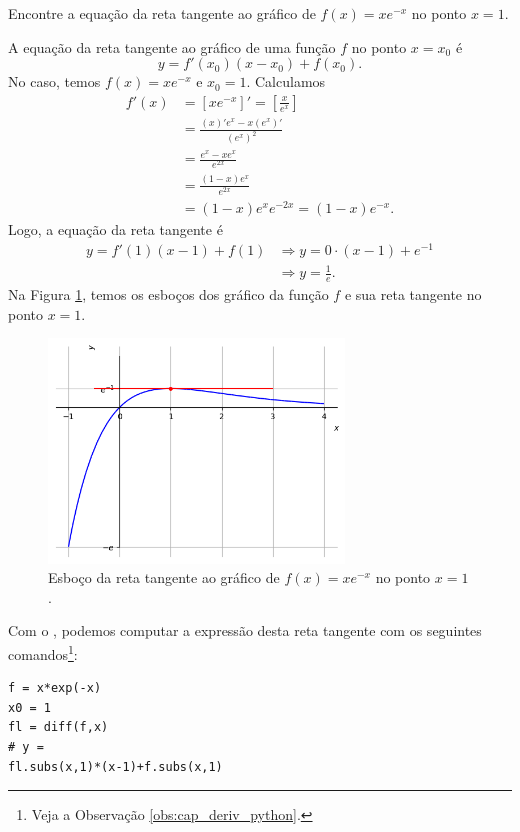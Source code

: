 \begin{exeresol}
  Encontre a equação da reta tangente ao gráfico de $f(x) = xe^{-x}$ no ponto $x=1$.
\end{exeresol}
\begin{resol}
  A equação da reta tangente ao gráfico de uma função $f$ no ponto $x=x_0$ é
  \begin{equation}
    y = f'(x_0)(x-x_0)+f(x_0).
  \end{equation}
  No caso, temos $f(x)=xe^{-x}$ e $x_0=1$. Calculamos
  \begin{align}
    f'(x) &= [xe^{-x}]' = \left[\frac{x}{e^x}\right] \\
          &= \frac{(x)'e^x-x(e^x)'}{(e^x)^2} \\
          &= \frac{e^x-xe^x}{e^{2x}} \\
          &= \frac{(1-x)e^x}{e^{2x}} \\
          &= (1-x)e^xe^{-2x} = (1-x)e^{-x}.
  \end{align}
  Logo, a equação da reta tangente é
  \begin{align}
    y = f'(1)(x-1)+f(1) &\Rightarrow y = 0\cdot (x-1) + e^{-1}\\
                        &\Rightarrow y = \frac{1}{e}.
  \end{align}
  Na Figura \ref{fig:deriv_exeresol_rt_xe-x}, temos os esboços dos gráfico da função $f$ e sua reta tangente no ponto $x=1$.

  \begin{figure}[H]
    \centering
    \includegraphics[width=0.7\textwidth]{./cap_deriv/dados/fig_deriv_exeresol_rt_xe-x/fig_deriv_exeresol_rt_xe-x}
    \caption{Esboço da reta tangente ao gráfico de $f(x)=xe^{-x}$ no ponto $x=1$.}
    \label{fig:deriv_exeresol_rt_xe-x}
  \end{figure}

  \ifispython
  Com o \sympy, podemos computar a expressão desta reta tangente com os seguintes comandos\footnote{Veja a Observação \ref{obs:cap_deriv_python}.}:
\begin{verbatim}
f = x*exp(-x)
x0 = 1
fl = diff(f,x)
# y = 
fl.subs(x,1)*(x-1)+f.subs(x,1)
\end{verbatim}
  \fi
\end{resol}

